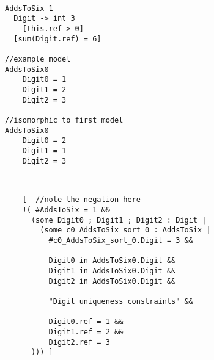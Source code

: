 \documentclass{easychair}
\begin{document}
\begin{figure}[!t]
\par\noindent
\begin{minipage}[t]{.49\textwidth}
\begin{lstlisting}[language=clafer, caption=A specification with 6 isomorphic models. Below are two example models., label={listing:isospecification}, xleftmargin=.2\textwidth, xrightmargin=.2\textwidth]

AddsToSix 1
  Digit -> int 3
    [this.ref > 0]
  [sum(Digit.ref) = 6]
  
//example model
AddsToSix0
    Digit0 = 1
    Digit1 = 2
    Digit2 = 3

//isomorphic to first model
AddsToSix0
    Digit0 = 2
    Digit1 = 1
    Digit2 = 3    
  
\end{lstlisting}%
\end{minipage}%
\hfill
\begin{minipage}[t]{.49\textwidth}
\begin{lstlisting}[language=clafer, caption=The Clafer constraint restricting all models isomorphic to Listing \ref{listing:isospecification}., label={listing:isoconstraint}]

    [  //note the negation here
    !( #AddsToSix = 1 &&
      (some Digit0 ; Digit1 ; Digit2 : Digit | 
        (some c0_AddsToSix_sort_0 : AddsToSix | 
          #c0_AddsToSix_sort_0.Digit = 3 &&

          Digit0 in AddsToSix0.Digit &&
          Digit1 in AddsToSix0.Digit &&
          Digit2 in AddsToSix0.Digit &&

          "Digit uniqueness constraints" && 

          Digit0.ref = 1 &&
          Digit1.ref = 2 &&
          Digit2.ref = 3
      ))) ]
\end{lstlisting}%
\end{minipage}%
\end{figure}
\end{document}
